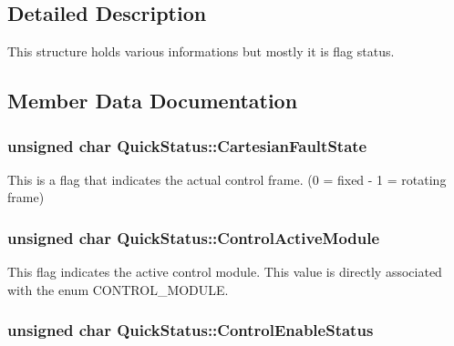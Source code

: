 \subsection{Detailed Description}
This structure holds various informations but mostly it is flag status. 

\subsection{Member Data Documentation}
\subsubsection[{\texorpdfstring{Cartesian\+Fault\+State}{CartesianFaultState}}]{\setlength{\rightskip}{0pt plus 5cm}unsigned char Quick\+Status\+::\+Cartesian\+Fault\+State}\hypertarget{struct_quick_status_a738566489a176b3dbe45c5628239c6d1}{}\label{struct_quick_status_a738566489a176b3dbe45c5628239c6d1}


This is a flag that indicates the actual control frame. (0 = fixed -\/ 1 = rotating frame) 

\subsubsection[{\texorpdfstring{Control\+Active\+Module}{ControlActiveModule}}]{\setlength{\rightskip}{0pt plus 5cm}unsigned char Quick\+Status\+::\+Control\+Active\+Module}\hypertarget{struct_quick_status_ab707e183f53af1789d2122a76ebb1786}{}\label{struct_quick_status_ab707e183f53af1789d2122a76ebb1786}


This flag indicates the active control module. This value is directly associated with the enum C\+O\+N\+T\+R\+O\+L\+\_\+\+M\+O\+D\+U\+LE. 

\subsubsection[{\texorpdfstring{Control\+Enable\+Status}{ControlEnableStatus}}]{\setlength{\rightskip}{0pt plus 5cm}unsigned char Quick\+Status\+::\+Control\+Enable\+Status}\hypertarget{struct_quick_status_ab83f9950c5baaae77754d2fd9c42b3f8}{}\label{struct_quick_status_ab83f9950c5baaae77754d2fd9c42b3f8}


